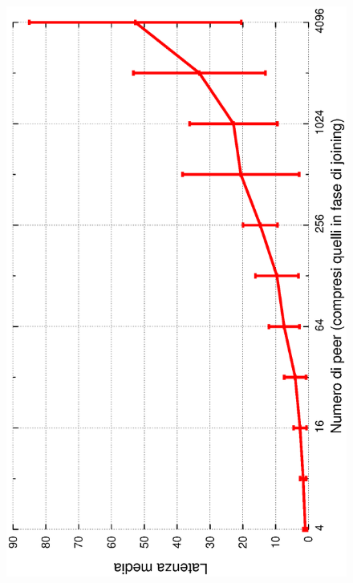 \documentclass[prodmode,acmtap]{acmlarge}
\begin{document}
\begin{figure}
\includegraphics[scale=.32, angle=-90]{imgs/norelink-conc-stability2-hops.eps}

\end{figure}
\end{document}
